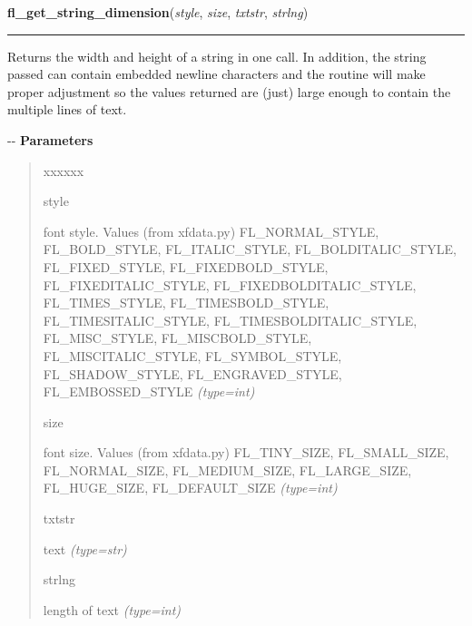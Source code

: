 \hspace{.8\funcindent}\begin{boxedminipage}{\funcwidth}

    \raggedright \textbf{fl\_get\_string\_dimension}(\textit{style}, \textit{size}, \textit{txtstr}, \textit{strlng})

    \vspace{-1.5ex}

    \rule{\textwidth}{0.5\fboxrule}
\setlength{\parskip}{2ex}

Returns the width and height of a string in one call. In addition, the
string passed can contain embedded newline characters and the routine will
make proper adjustment so the values returned are (just) large enough to
contain the multiple lines of text.

-{}-
\setlength{\parskip}{1ex}
      \textbf{Parameters}
      \vspace{-1ex}

      \begin{quote}
        \begin{Ventry}{xxxxxx}

          \item[style]


font style. Values (from xfdata.py) FL\_NORMAL\_STYLE, FL\_BOLD\_STYLE,
FL\_ITALIC\_STYLE, FL\_BOLDITALIC\_STYLE, FL\_FIXED\_STYLE,
FL\_FIXEDBOLD\_STYLE, FL\_FIXEDITALIC\_STYLE, FL\_FIXEDBOLDITALIC\_STYLE,
FL\_TIMES\_STYLE, FL\_TIMESBOLD\_STYLE, FL\_TIMESITALIC\_STYLE,
FL\_TIMESBOLDITALIC\_STYLE, FL\_MISC\_STYLE, FL\_MISCBOLD\_STYLE,
FL\_MISCITALIC\_STYLE, FL\_SYMBOL\_STYLE, FL\_SHADOW\_STYLE,
FL\_ENGRAVED\_STYLE, FL\_EMBOSSED\_STYLE
            {\it (type=int)}

          \item[size]


font size. Values (from xfdata.py) FL\_TINY\_SIZE, FL\_SMALL\_SIZE,
FL\_NORMAL\_SIZE, FL\_MEDIUM\_SIZE, FL\_LARGE\_SIZE, FL\_HUGE\_SIZE,
FL\_DEFAULT\_SIZE
            {\it (type=int)}

          \item[txtstr]


text
            {\it (type=str)}

          \item[strlng]


length of text
            {\it (type=int)}

        \end{Ventry}

      \end{quote}


\end{boxedminipage}
